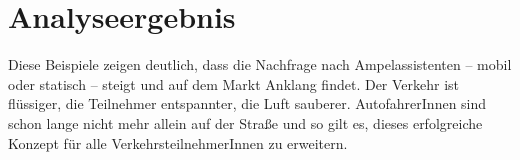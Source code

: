\section{Analyseergebnis}
Diese Beispiele zeigen deutlich, dass die Nachfrage nach Ampelassistenten -- mobil oder statisch -- steigt und auf dem Markt Anklang findet. Der Verkehr ist flüssiger, die Teilnehmer entspannter, die Luft sauberer. AutofahrerInnen sind schon lange nicht mehr allein auf der Straße und so gilt es, dieses erfolgreiche Konzept für alle VerkehrsteilnehmerInnen zu erweitern.
